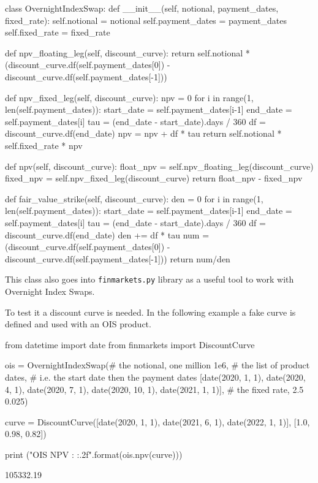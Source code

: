 \begin{ipython}
class OvernightIndexSwap:
    def __init__(self, notional, payment_dates, fixed_rate):
        self.notional = notional 
        self.payment_dates = payment_dates
        self.fixed_rate = fixed_rate

    def npv_floating_leg(self, discount_curve):
        return self.notional * (discount_curve.df(self.payment_dates[0]) -
                                discount_curve.df(self.payment_dates[-1]))

    def npv_fixed_leg(self, discount_curve):
        npv = 0
        for i in range(1, len(self.payment_dates)):
            start_date = self.payment_dates[i-1]
            end_date = self.payment_dates[i]
            tau = (end_date - start_date).days / 360
            df = discount_curve.df(end_date)
            npv = npv + df * tau
        return self.notional * self.fixed_rate * npv

    def npv(self, discount_curve):
        float_npv = self.npv_floating_leg(discount_curve)
        fixed_npv = self.npv_fixed_leg(discount_curve)
        return float_npv - fixed_npv

    def fair_value_strike(self, discount_curve):
        den = 0
        for i in range(1, len(self.payment_dates)):
            start_date = self.payment_dates[i-1]
            end_date = self.payment_dates[i]
            tau = (end_date - start_date).days / 360
            df = discount_curve.df(end_date)
            den += df * tau
            num = (discount_curve.df(self.payment_dates[0]) -
                discount_curve.df(self.payment_dates[-1]))
        return num/den

\end{ipython}

\begin{finmarkets}
This class also goes into \texttt{finmarkets.py} library as a useful tool to work with Overnight Index Swaps.
\end{finmarkets}

To test it a discount curve is needed. In the following example a fake curve is defined and used with an OIS product.

\begin{ipython}
from datetime import date
from finmarkets import DiscountCurve

ois = OvernightIndexSwap(# the notional, one million
                         1e6,
                         # the list of product dates,
                         # i.e. the start date then the payment dates
                         [date(2020, 1, 1), date(2020, 4, 1),
                          date(2020, 7, 1), date(2020, 10, 1),
                          date(2021, 1, 1)],
                         # the fixed rate, 2.5%
                         0.025)

curve = DiscountCurve([date(2020, 1, 1), date(2021, 6, 1),
                       date(2022, 1, 1)],
                      [1.0, 0.98, 0.82])

print ("OIS NPV : {:.2f}".format(ois.npv(curve)))
\end{ipython}
\begin{ioutput}
105332.19
\end{ioutput}

